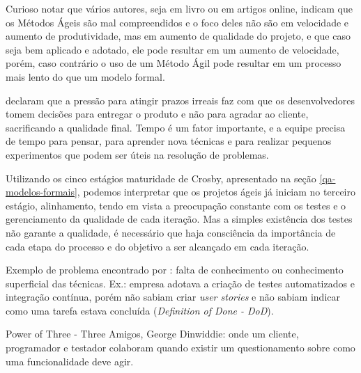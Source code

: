 \documentclass[
	12pt,				%
	openright,			%
	oneside,			%
	a4paper,			%
	english,			%
	brazil,				%
	]{abntex2}
\begin{document}

Curioso notar que vários autores, seja em livro ou em artigos online, indicam que os Métodos Ágeis são mal compreendidos e o foco deles não são em velocidade e aumento de produtividade, mas em aumento de qualidade do projeto, e que caso seja bem aplicado e adotado, ele pode resultar em um aumento de velocidade, porém, caso contrário o uso de um Método Ágil pode resultar em um processo mais lento do que um modelo formal. \cite{galen2015} %

 declaram que a pressão para atingir prazos irreais faz com que os desenvolvedores tomem decisões para entregar o produto e não para agradar ao cliente, sacrificando a qualidade final. Tempo é um fator importante, e a equipe precisa de tempo para pensar, para aprender nova técnicas e para realizar pequenos experimentos que podem ser úteis na resolução de problemas.

Utilizando os cinco estágios maturidade de Crosby, apresentado na seção \autoref{qa-modelos-formais}, podemos interpretar que os projetos ágeis já iniciam no terceiro estágio, alinhamento, tendo em vista a preocupação constante com os testes e o gerenciamento da qualidade de cada iteração. Mas a simples existência dos testes não garante a qualidade, é necessário que haja consciência da importância de cada etapa do processo e do objetivo a ser alcançado em cada iteração.

Exemplo de problema encontrado por : falta de conhecimento ou conhecimento superficial das técnicas. Ex.: empresa adotava a criação de testes automatizados e integração contínua, porém não sabiam criar \emph{user stories} e não sabiam indicar como uma tarefa estava concluída (\emph{Definition of Done - DoD}).

Power of Three - Three Amigos, George Dinwiddie: onde um cliente, programador e testador colaboram quando existir um questionamento sobre como uma funcionalidade deve agir.
\end{document}
